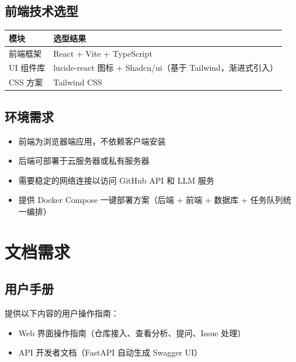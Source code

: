 \documentclass[10pt,a4paper]{article}
\newenvironment{ieeetable}{\begin{center}}{\end{center}}
\begin{document}
\subsection{前端技术选型}

\begin{ieeetable}
    \begin{tabularx}{\textwidth}{L{3.5cm} X}
        \toprule
        \textbf{模块} & \textbf{选型结果} \\
        \midrule
        前端框架 & React + Vite + TypeScript \\
        \midrule
        UI 组件库 & lucide-react 图标 + Shadcn/ui（基于 Tailwind，渐进式引入） \\
        \midrule
        CSS 方案 & Tailwind CSS \\
        \bottomrule
    \end{tabularx}
\end{ieeetable}

\subsection{环境需求}

\begin{itemize}
    \item 前端为浏览器端应用，不依赖客户端安装
    \item 后端可部署于云服务器或私有服务器
    \item 需要稳定的网络连接以访问 GitHub API 和 LLM 服务
    \item 提供 Docker Compose 一键部署方案（后端 + 前端 + 数据库 + 任务队列统一编排）
\end{itemize}

\section{文档需求}

\subsection{用户手册}

提供以下内容的用户操作指南：
\begin{itemize}
    \item Web 界面操作指南（仓库接入、查看分析、提问、Issue 处理）
    \item API 开发者文档（FastAPI 自动生成 Swagger UI）
\end{itemize}
\end{document}
